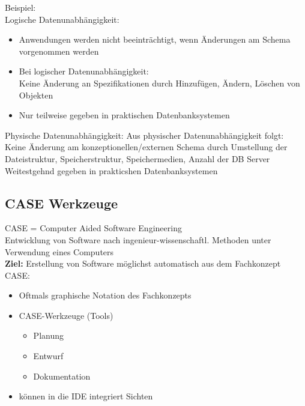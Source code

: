 \documentclass{scrreprt}
\newcommand\tab[1][1cm]{\hspace*{#1}}
\begin{document}
Beispiel:
\\Logische Datenunabhängigkeit:
\begin{itemize}
  \item Anwendungen werden nicht beeinträchtigt, wenn Änderungen am Schema vorgenommen werden
  \item Bei logischer Datenunabhängigkeit:
  \\Keine Änderung an Spezifikationen durch Hinzufügen, Ändern, Löschen von Objekten
  \item Nur teilweise gegeben in praktischen Datenbanksystemen
\end{itemize}
Physische Datenunabhängigkeit:
\tab Aus physischer Datenunabhängigkeit folgt:
\\\tab Keine Änderung am konzeptionellen/externen Schema durch Umstellung der
Dateistruktur, Speicherstruktur, Speichermedien, Anzahl der DB Server
\\\tab Weitestgehnd gegeben in prakticshen Datenbanksystemen
\subsection{CASE Werkzeuge}
CASE = Computer Aided Software Engineering
\\Entwicklung von Software nach ingenieur-wissenschaftl. Methoden unter Verwendung eines Computers
\\\textbf{Ziel:} Erstellung von Software möglichst automatisch aus dem Fachkonzept
CASE:
\begin{itemize}
  \item Oftmals graphische Notation des Fachkonzepts
  \item CASE-Werkzeuge (Tools)
  \begin{itemize}
    \item Planung
    \item Entwurf
    \item Dokumentation
  \end{itemize}
  \item können in die IDE integriert Sichten
\end{itemize}
\end{document}
